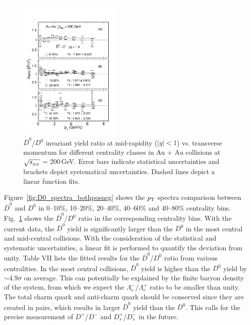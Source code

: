 \documentclass[%
 reprint,	
 amsmath,amssymb,
 aps,
 prc,
]{revtex4-1}
\begin{document}
\begin{figure}
\centering
\includegraphics[width=0.45\textwidth]{fig/D0_spectra_ratioposneg_fit.pdf}
\caption{$\overline{D}^{0}$/$D^{0}$ invariant yield ratio at mid-rapidity ($|y|<1$) vs. transverse momentum for different centrality classes in Au + Au collisions at $\sqrt{s_{_{\rm NN}}}$ = 200\,GeV. Error bars indicate statistical uncertainties and brackets depict systematical uncertainties. Dashed lines depict a linear function fits.}
\label{fig:D0_spectra_ratioposneg} 
\end{figure}


Figure~\ref{fig:D0_spectra_bothposneg} shows the $p_{\rm T}$ spectra comparison between $\overline{D}^{0}$ and $D^0$ in 0--10\%, 10--20\%, 20--40\%, 40--60\% and 40--80\% centrality bins. Fig.~\ref{fig:D0_spectra_ratioposneg} shows the $\overline{D}^{0}$/$D^{0}$ ratio in the corresponding centrality bins. With the current data, the $\overline{D}^{0}$ yield is significantly larger than the $D^{0}$ in the most central and mid-central collisions. With the consideration of the statistical and systematic uncertainties, a linear fit is performed to quantify the deviation from unity. Table %
VII lists the fitted results for the $\overline{D}^{0}$/$D^0$ ratio from various centralities. In the most central collisions, $\overline{D}^{0}$ yield is higher than the $D^0$ yield by $\sim$4.9$\sigma$ on average. This can potentially be explained by the finite baryon density of the system, from which we expect the $\Lambda_{c}^-$/$\Lambda_{c}^+$ ratio to be smaller than unity. The total charm quark and anti-charm quark should be conserved since they are created in pairs, which results in larger $\overline{D}^{0}$ yield than the $D^0$. This calls for the precise measurement of $D^{+}$/$D^{-}$ and $D_{s}^{+}$/$D_{s}^{-}$ in the future.
\end{document}
